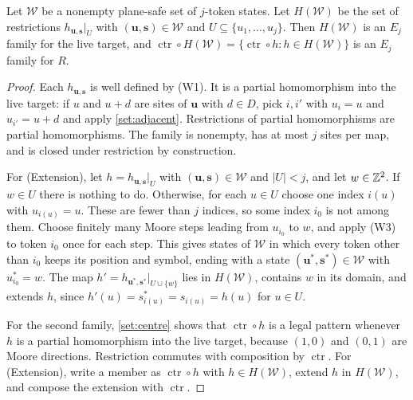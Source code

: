 \begin{lemma}\label{set:family}
Let $\mathcal W$ be a nonempty plane-safe set of $j$-token states. Let $H(\mathcal W)$ be the set of restrictions $h_{\mathbf u,\mathbf s}|_U$ with $(\mathbf u,\mathbf s)\in\mathcal W$ and $U\subseteq\{u_1,\dots,u_j\}$. Then $H(\mathcal W)$ is an $E_j$ family for the live target, and $\operatorname{ctr}\circ H(\mathcal W)=\{\operatorname{ctr}\circ h: h\in H(\mathcal W)\}$ is an $E_j$ family for $R$.
\end{lemma}

\begin{proof}
Each $h_{\mathbf u,\mathbf s}$ is well defined by (W1). It is a partial homomorphism into the live target: if $u$ and $u+d$ are sites of $\mathbf u$ with $d\in D$, pick $i,i'$ with $u_i=u$ and $u_{i'}=u+d$ and apply \cref{set:adjacent}. Restrictions of partial homomorphisms are partial homomorphisms. The family is nonempty, has at most $j$ sites per map, and is closed under restriction by construction.

For (Extension), let $h=h_{\mathbf u,\mathbf s}|_U$ with $(\mathbf u,\mathbf s)\in\mathcal W$ and $|U|<j$, and let $w\in\mathbb{Z}^2$. If $w\in U$ there is nothing to do. Otherwise, for each $u\in U$ choose one index $i(u)$ with $u_{i(u)}=u$. These are fewer than $j$ indices, so some index $i_0$ is not among them. Choose finitely many Moore steps leading from $u_{i_0}$ to $w$, and apply (W3) to token $i_0$ once for each step. This gives states of $\mathcal W$ in which every token other than $i_0$ keeps its position and symbol, ending with a state $(\mathbf u^*,\mathbf s^*)\in\mathcal W$ with $u^*_{i_0}=w$. The map $h'=h_{\mathbf u^*,\mathbf s^*}|_{U\cup\{w\}}$ lies in $H(\mathcal W)$, contains $w$ in its domain, and extends $h$, since $h'(u)=s^*_{i(u)}=s_{i(u)}=h(u)$ for $u\in U$.

For the second family, \cref{set:centre} shows that $\operatorname{ctr}\circ h$ is a legal pattern whenever $h$ is a partial homomorphism into the live target, because $(1,0)$ and $(0,1)$ are Moore directions. Restriction commutes with composition by $\operatorname{ctr}$. For (Extension), write a member as $\operatorname{ctr}\circ h$ with $h\in H(\mathcal W)$, extend $h$ in $H(\mathcal W)$, and compose the extension with $\operatorname{ctr}$.
\end{proof}

